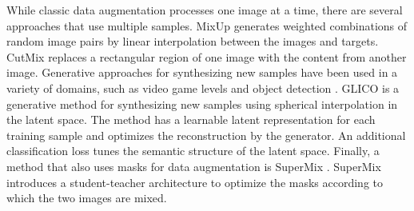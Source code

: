 \documentclass{article}
\begin{document}
While classic data augmentation processes one image at a time, there are several approaches that use multiple samples.
MixUp \cite{zhangMixupEmpiricalRisk2018} generates weighted combinations of random image pairs by linear interpolation between the images and targets.
CutMix \cite{yunCutMixRegularizationStrategy2019} replaces a rectangular region of one image with the content from another image.
Generative approaches for synthesizing new samples have been used in a variety of domains, such as video game levels \cite{Awiszus_Schubert_Rosenhahn_2020,SchuAwi2021} and object detection \cite{KluRei2018}.
\ac{GLICO} \cite{azuriGenerativeLatentImplicit2021} is a generative method for synthesizing new samples using spherical interpolation in the latent space. The method has a learnable latent representation for each training sample and optimizes the reconstruction by the generator. 
An additional classification loss tunes the semantic structure of the latent space. 
Finally, a method that also uses masks for data augmentation is SuperMix \cite{daboueiSuperMixSupervisingMixing2021}.
SuperMix introduces a student-teacher architecture to optimize the masks according to which the two images are mixed.
\end{document}
